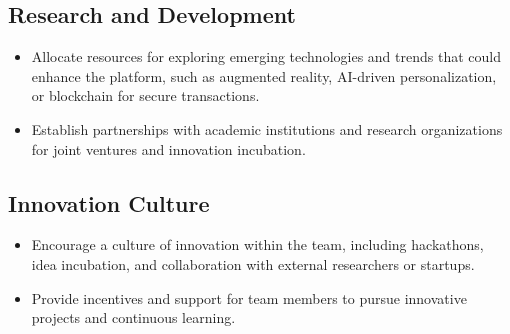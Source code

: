 \documentclass[11pt]{article}
\begin{document}
	\subsection*{Research and Development}
	\begin{itemize}
		\item Allocate resources for exploring emerging technologies and trends that could enhance the platform, such as augmented reality, AI-driven personalization, or blockchain for secure transactions.
		\item Establish partnerships with academic institutions and research organizations for joint ventures and innovation incubation.
	\end{itemize}
	
	\subsection*{Innovation Culture}
	\begin{itemize}
		\item Encourage a culture of innovation within the team, including hackathons, idea incubation, and collaboration with external researchers or startups.
		\item Provide incentives and support for team members to pursue innovative projects and continuous learning.
	\end{itemize}
	
\end{document}
